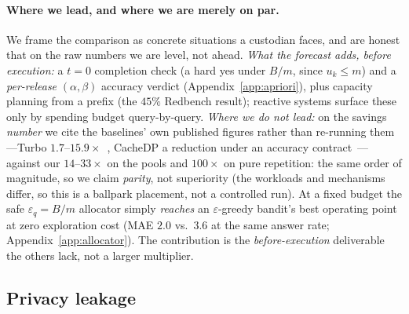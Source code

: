 \documentclass[sigconf,nonacm]{acmart}
\newcommand{\eps}{\varepsilon}
\begin{document}
\paragraph{Where we lead, and where we are merely on par.} We frame the comparison as concrete situations a custodian faces, and are honest that on the raw numbers we are level, not ahead. \emph{What the forecast adds, before execution:} a $t{=}0$ completion check (a hard yes under $B/m$, since $u_k\le m$) and a \emph{per-release} $(\alpha,\beta)$ accuracy verdict (Appendix~\ref{app:apriori}), plus capacity planning from a prefix (the $45\%$ Redbench result); reactive systems surface these only by spending budget query-by-query. \emph{Where we do not lead:} on the savings \emph{number} we cite the baselines' own published figures rather than re-running them---Turbo $1.7$--$15.9\times$~\cite{kostopoulou2023turbo}, CacheDP a reduction under an accuracy contract~\cite{mazmudar2023cachedp}---against our $14$--$33\times$ on the pools and $100\times$ on pure repetition: the same order of magnitude, so we claim \emph{parity}, not superiority (the workloads and mechanisms differ, so this is a ballpark placement, not a controlled run). At a fixed budget the safe $\eps_q{=}B/m$ allocator simply \emph{reaches} an $\eps$-greedy bandit's best operating point at zero exploration cost (MAE $2.0$ vs.\ $3.6$ at the same answer rate; Appendix~\ref{app:allocator}). The contribution is the \emph{before-execution} deliverable the others lack, not a larger multiplier.

\subsection{Privacy leakage}
\end{document}
